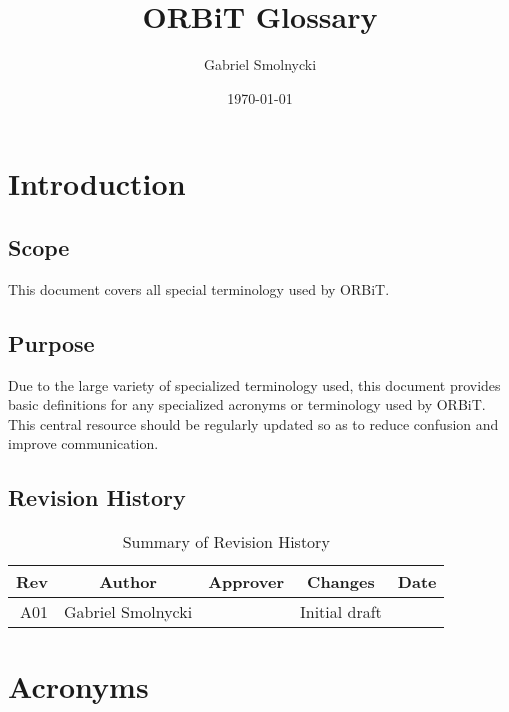 \documentclass[12pt,article]{memoir}
\title{ORBiT Glossary}
\author{Gabriel Smolnycki}
\date{\today}
\begin{document}
	


\tableofcontents*
\clearpage


\chapter{Introduction}
\section{Scope}
This document covers all special terminology used by ORBiT.

\section{Purpose}
Due to the large variety of specialized terminology used, this document provides basic definitions for any specialized acronyms or terminology used by ORBiT. This central resource should be regularly updated so as to reduce confusion and improve communication.

\section{Revision History}
\begin{table}[H]
	\centering
	\begin{tabu}{r || c | c | c | c }
		Rev & Author & Approver & Changes & Date\\ \hline
		A01 & Gabriel Smolnycki & & Initial draft & \\
	\end{tabu}
	\caption{Summary of Revision History}
	\label{tab:rev}
\end{table}

\newpage

\chapter{Acronyms}
\end{document}
